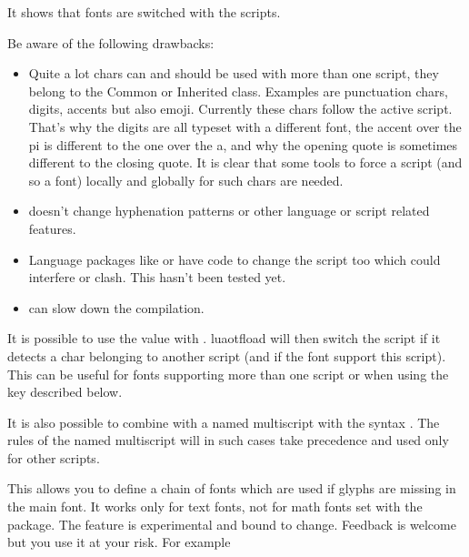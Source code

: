   It shows that fonts are switched with the scripts.

  Be aware of the following drawbacks:

  \begin{itemize}
  \item Quite a lot chars can and should be used with more than one script, they belong to the Common or Inherited class. Examples are punctuation chars, digits, accents but also emoji. Currently these chars follow the active script. That's why the digits are all typeset with a different font, the accent over the pi is different to the one over the a, and why the opening quote is sometimes different to the closing quote. It is clear that some tools to force a script (and so a font) locally and globally for such chars are needed.

  \item {} doesn't change hyphenation patterns or other language or script related features.

  \item Language packages like  or  have code to change the script too which could interfere or clash. This hasn't been tested yet.

  \item {} can slow down the compilation.
  \end{itemize}

  It is possible to use the value  with . luaotfload will then switch the script if it detects a char belonging to another script (and if the font support this script). This can be useful for fonts supporting more than one script or when using the  key described below.

  It is also possible to combine   with a named multiscript with the syntax . The rules of the named multiscript will in such cases take precedence and  used only for other scripts.



  \endaltitem

   This\label{fallback}
   allows you to define a chain of fonts which are used if glyphs are missing in the main font.
   It works only for text fonts, not for math fonts set with the   package.
   The feature is experimental and bound to change. Feedback is welcome but you use it at your risk.
   For example

